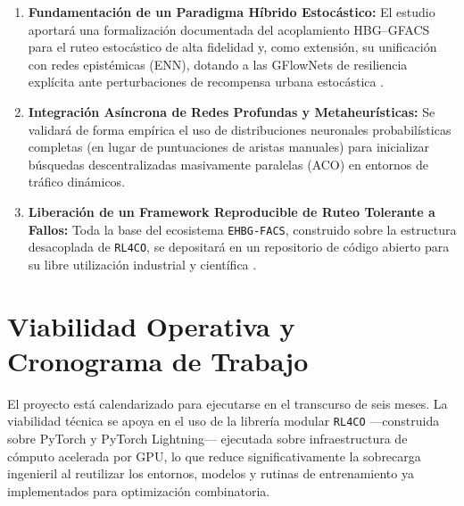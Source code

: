 \documentclass[12pt]{report}
\begin{document}
\begin{enumerate}[label=\textbf{C\arabic*.},leftmargin=1.5cm,itemsep=0.5em]
  \item \textbf{Fundamentaci\'on de un Paradigma H\'ibrido Estoc\'astico:} El estudio aportar\'a una formalizaci\'on documentada del acoplamiento HBG--GFACS para el ruteo estoc\'astico de alta fidelidad y, como extensi\'on, su unificaci\'on con redes epist\'emicas (ENN), dotando a las GFlowNets de resiliencia expl\'icita ante perturbaciones de recompensa urbana estoc\'astica \cite{Zhang2025Hybrid, ENN_GFN_2025}.
  \item \textbf{Integraci\'on As\'incrona de Redes Profundas y Metaheur\'isticas:} Se validar\'a de forma emp\'irica el uso de distribuciones neuronales probabil\'isticas completas (en lugar de puntuaciones de aristas manuales) para inicializar b\'usquedas descentralizadas masivamente paralelas (ACO) en entornos de tr\'afico din\'amicos.
  \item \textbf{Liberaci\'on de un Framework Reproducible de Ruteo Tolerante a Fallos:} Toda la base del ecosistema \texttt{EHBG-FACS}, construido sobre la estructura desacoplada de \texttt{RL4CO}, se depositar\'a en un repositorio de c\'odigo abierto para su libre utilizaci\'on industrial y cient\'ifica \cite{Berto2023RL4CO}.
\end{enumerate}

\chapter*{Viabilidad Operativa y Cronograma de Trabajo}

El proyecto est\'a calendarizado para ejecutarse en el transcurso de seis meses. La viabilidad t\'ecnica se apoya en el uso de la librer\'ia modular \texttt{RL4CO} ---construida sobre PyTorch y PyTorch Lightning--- ejecutada sobre infraestructura de c\'omputo acelerada por GPU, lo que reduce significativamente la sobrecarga ingenieril al reutilizar los entornos, modelos y rutinas de entrenamiento ya implementados para optimizaci\'on combinatoria.
\end{document}
